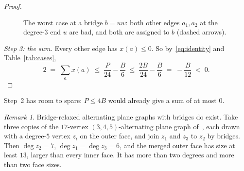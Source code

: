 \documentclass{amsart}
\theoremstyle{plain}
\theoremstyle{definition}
\theoremstyle{remark}
\newtheorem{remark}[theorem]{Remark}
\begin{document}
\begin{proof}
\begin{figure}[ht]
\centering
{}
\caption{The worst case at a bridge $b=uw$: both other edges $a_1,a_2$ at the
degree-$3$ end $u$ are bad, and both are assigned to $b$ (dashed
arrows).}\label{fig:assign}
\end{figure}

\smallskip
\emph{Step 3: the sum.} Every other edge has $x(a) \le 0$. So
by~\eqref{eq:identity} and Table~\ref{tab:cases},
\begin{equation}\label{eq:final}
  2 \;=\; \sum_a x(a) \;\le\; \frac{P}{24} - \frac{B}{6}
     \;\le\; \frac{2B}{24} - \frac{B}{6} \;=\; -\frac{B}{12} \;<\; 0 .
\end{equation}
\end{proof}

Step~2 has room to spare: $P \le 4B$ would already give a sum of at most $0$.

\begin{remark}
Bridge-relaxed alternating plane graphs with bridges do exist. Take three copies
of the $17$-vertex $(3,4,5)$-alternating plane graph of~\cite[Figure~2]{AHSSV2015},
each drawn with a degree-$5$ vertex $z_i$ on the outer face, and join $z_1$ and
$z_3$ to $z_2$ by bridges. Then $\deg z_2 = 7$, $\deg z_1 = \deg z_3 = 6$, and
the merged outer face has size at least $13$, larger than every inner face. It
has more than two degrees and more than two face sizes.
\end{remark}
\end{document}
